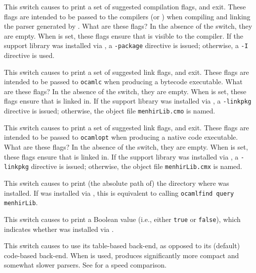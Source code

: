 \documentclass[onecolumn,11pt,nocopyrightspace,preprint]{sigplanconf}
\begin{document}
\docswitch{\osuggestcomp} This switch causes \menhir to print a set of
suggested compilation flags, and exit. These flags are intended to be passed
to the \ocaml compilers (\ocamlc or \ocamlopt) when compiling and linking the
parser generated by \menhir. What are these flags? In the absence of the
\otable switch, they are empty. When \otable is set, these flags ensure that
\menhirlib is visible to the \ocaml compiler. If the support library
\menhirlib was installed via \ocamlfind, a \texttt{-package} directive is
issued; otherwise, a \texttt{-I} directive is used.

\docswitch{\osuggestlinkb} This switch causes \menhir to print a set of
suggested link flags, and exit. These flags are intended to be passed to
\texttt{ocamlc} when producing a bytecode executable. What are these flags? In
the absence of the \otable switch, they are empty. When \otable is set, these
flags ensure that \menhirlib is linked in. If the support library \menhirlib
was installed via \ocamlfind, a \texttt{-linkpkg} directive is issued;
otherwise, the object file \texttt{menhirLib.cmo} is named.

\docswitch{\osuggestlinko} This switch causes \menhir to print a set of
suggested link flags, and exit. These flags are intended to be passed to
\texttt{ocamlopt} when producing a native code executable. What are these
flags? In the absence of the \otable switch, they are empty. When \otable is
set, these flags ensure that \menhirlib is linked in. If the support library
\menhirlib was installed via \ocamlfind, a \texttt{-linkpkg} directive is
issued; otherwise, the object file \texttt{menhirLib.cmx} is named.

\docswitch{\osuggestmenhirlib} This switch causes \menhir to print (the
absolute path of) the directory where \menhirlib was installed. If \menhirlib
was installed via \ocamlfind, this is equivalent to calling \texttt{ocamlfind
query menhirLib}.

\docswitch{\osuggestocamlfind} This switch causes \menhir to print a Boolean
value (i.e., either \texttt{true} or \texttt{false}), which indicates whether
\menhirlib was installed via \ocamlfind.

\docswitch{\otable} This switch causes \menhir to use its table-based
back-end, as opposed to its (default) code-based back-end. When \otable is
used, \menhir produces significantly more compact and somewhat slower parsers.
See  for a speed comparison.
\end{document}
